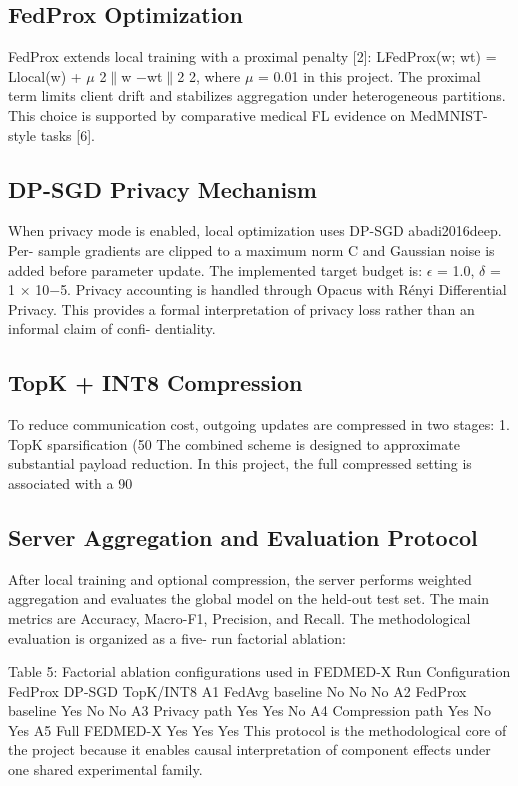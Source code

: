 \documentclass[12pt,a4paper]{report}
\begin{document}
\subsection{FedProx Optimization}
FedProx extends local training with a proximal penalty [2]:
LFedProx(w; wt) = Llocal(w) + $\mu$ 2$\|$w $-$wt$\|$2 2, where $\mu$ = 0.01 in this project. The proximal term limits client drift and stabilizes aggregation under heterogeneous partitions. This choice is supported by comparative medical FL evidence on MedMNIST-style tasks [6].

\subsection{DP-SGD Privacy Mechanism}
When privacy mode is enabled, local optimization uses DP-SGD abadi2016deep. Per- sample gradients are clipped to a maximum norm C and Gaussian noise is added before parameter update. The implemented target budget is:
$\epsilon$ = 1.0, $\delta$ = 1 × 10$-$5.
Privacy accounting is handled through Opacus with Rényi Differential Privacy. This provides a formal interpretation of privacy loss rather than an informal claim of confi- dentiality.
\subsection{TopK + INT8 Compression}
To reduce communication cost, outgoing updates are compressed in two stages:
1. TopK sparsification (50%
The combined scheme is designed to approximate substantial payload reduction. In this project, the full compressed setting is associated with a 90%
\subsection{Server Aggregation and Evaluation Protocol}
After local training and optional compression, the server performs weighted aggregation and evaluates the global model on the held-out test set. The main metrics are Accuracy,
Macro-F1, Precision, and Recall. The methodological evaluation is organized as a five- run factorial ablation:

Table 5: Factorial ablation configurations used in FEDMED-X
Run
Configuration
FedProx
DP-SGD
TopK/INT8
A1
FedAvg baseline
No
No
No
A2
FedProx baseline
Yes
No
No
A3
Privacy path
Yes
Yes
No
A4
Compression path
Yes
No
Yes
A5
Full FEDMED-X
Yes
Yes
Yes
This protocol is the methodological core of the project because it enables causal interpretation of component effects under one shared experimental family.
\end{document}
